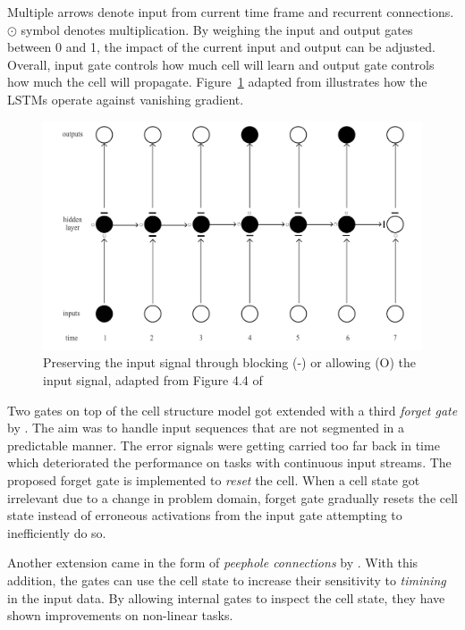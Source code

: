 Multiple arrows denote input from current time frame and recurrent connections.
$\odot$ symbol denotes multiplication.
By weighing the input and output gates between 0 and 1, the impact of the current input and output can be adjusted.
Overall, input gate controls how much cell will learn and output gate controls how much the cell will propagate.
Figure~\ref{fig:lstm_preserves} adapted from \textcite{graves_long_2012} illustrates how the LSTMs operate against vanishing gradient.

\begin{figure}[htbp]
    \centering
    \includegraphics[page=1,width=\textwidth]{Figures/outputs_hiddenlayer2.pdf}
    \caption{Preserving the input signal through blocking (-) or allowing (O) the input signal, adapted from Figure 4.4 of \textcite{graves_long_2012}}%
    \label{fig:lstm_preserves}
\end{figure}

Two gates on top of the cell structure model got extended with a third \emph{forget gate} by \textcite{gers_learning_2000}.
The aim was to handle input sequences that are not segmented in a predictable manner.
The error signals were getting carried too far back in time which deteriorated the performance on tasks with continuous input streams.
The proposed forget gate is implemented to \emph{reset} the cell.
When a cell state got irrelevant due to a change in problem domain, forget gate gradually resets the cell state instead of erroneous activations from the input gate attempting to inefficiently do so.

Another extension came in the form of \emph{peephole connections} by \textcite{gers_learning_2003}.
With this addition, the gates can use the cell state to increase their sensitivity to \emph{timining} in the input data.
By allowing internal gates to inspect the cell state, they have shown improvements on non-linear tasks.

